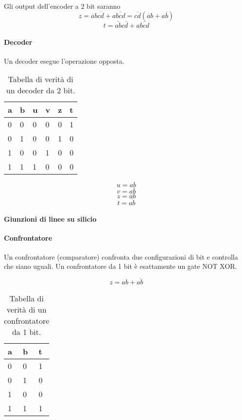 
Gli output dell'encoder a 2 bit saranno
\[ z = \overbar{a}b\overbar{cd}+a\overbar{bcd} = \overbar{cd}(\overbar{a}b+a\overbar{b}) \]
\[ t = \overbar{ab}c\overbar{d}+a\overbar{bcd} \]


\paragraph{Decoder}
Un decoder esegue l'operazione opposta.

\begin{table}[H]
	\centering
	\caption{Tabella di verità di un decoder da 2 bit.}
	\label{tab:2bitdecoder}
	\begin{tabular}{|ll|llll|}
		\hline
		a & b & u & v & z & t \\ \hline
		0 & 0 & 0 & 0 & 0 & 1 \\
		0 & 1 & 0 & 0 & 1 & 0 \\
		1 & 0 & 0 & 1 & 0 & 0 \\
		1 & 1 & 1 & 0 & 0 & 0 \\ \hline
	\end{tabular}
\end{table}



\[ u = ab  \]
\[ v = a\overbar{b} \]
\[ z = \overbar{a}b \]
\[ t = \overbar{ab} \]


\paragraph{Giunzioni di linee su silicio}


\paragraph{Confrontatore}
Un confrontatore (comparatore) confronta due configurazioni di bit e controlla che siano uguali. Un confrontatore da 1 bit è esattamente un gate NOT XOR.

\[ z = ab + \overbar{ab} \]

\begin{table}[H]
	\centering
	\caption{Tabella di verità di un confrontatore da 1 bit.}
	\label{tab:2bitcomparator}
	\begin{tabular}{|ll|l|}
		\hline
		a & b & t \\ \hline
		0 & 0 & 1 \\
		0 & 1 & 0 \\
		1 & 0 & 0 \\
		1 & 1 & 1 \\ \hline
	\end{tabular}
\end{table}

